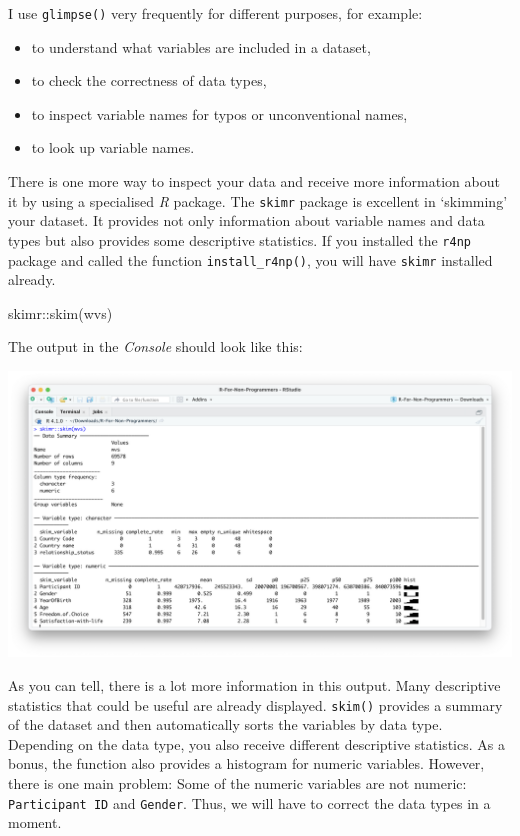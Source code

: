\documentclass[
  letterpaper,
]{krantz}
\makeatletter
\newenvironment{Shaded}{\begin{snugshade}}{\end{snugshade}}
\newcommand{\FunctionTok}[1]{\textcolor[rgb]{0.28,0.35,0.67}{#1}}
\newcommand{\NormalTok}[1]{\textcolor[rgb]{0.00,0.23,0.31}{#1}}
\newcommand{\SpecialCharTok}[1]{\textcolor[rgb]{0.37,0.37,0.37}{#1}}
\newenvironment{kframe}{%
\medskip{}
\setlength{\fboxsep}{.8em}
 \def\at@end@of@kframe{}%
 \ifinner\ifhmode%
  \def\at@end@of@kframe{\end{minipage}}%
  \begin{minipage}{\columnwidth}%
 \fi\fi%
 \def\FrameCommand##1{\hskip\@totalleftmargin \hskip-\fboxsep
 \colorbox{shadecolor}{##1}\hskip-\fboxsep
     \hskip-\linewidth \hskip-\@totalleftmargin \hskip\columnwidth}%
 \MakeFramed {\advance\hsize-\width
   \@totalleftmargin\z@ \linewidth\hsize
   \@setminipage}}%
 {\par\unskip\endMakeFramed%
 \at@end@of@kframe}
\renewenvironment{Shaded}{\begin{kframe}}{\end{kframe}}
\makeatother
\begin{document}
I use \texttt{glimpse()} very frequently for different purposes, for
example:

\begin{itemize}
\item
  to understand what variables are included in a dataset,
\item
  to check the correctness of data types,
\item
  to inspect variable names for typos or unconventional names,
\item
  to look up variable names.
\end{itemize}

There is one more way to inspect your data and receive more information
about it by using a specialised \emph{R} package. The \texttt{skimr}
package is excellent in `skimming' your dataset. It provides not only
information about variable names and data types but also provides some
descriptive statistics. If you installed the \texttt{r4np} package and
called the function \texttt{install\_r4np()}, you will have
\texttt{skimr} installed already.

\begin{Shaded}
\begin{Highlighting}[]
\NormalTok{skimr}\SpecialCharTok{::}\FunctionTok{skim}\NormalTok{(wvs)}
\end{Highlighting}
\end{Shaded}

The output in the \emph{Console} should look like this:

\includegraphics{images/chapter_07_img/02_skimr_output/skimr_output.png}

As you can tell, there is a lot more information in this output. Many
descriptive statistics that could be useful are already displayed.
\texttt{skim()} provides a summary of the dataset and then automatically
sorts the variables by data type. Depending on the data type, you also
receive different descriptive statistics. As a bonus, the function also
provides a histogram for numeric variables. However, there is one main
problem: Some of the numeric variables are not numeric:
\texttt{Participant\ ID} and \texttt{Gender}. Thus, we will have to
correct the data types in a moment.
\end{document}
